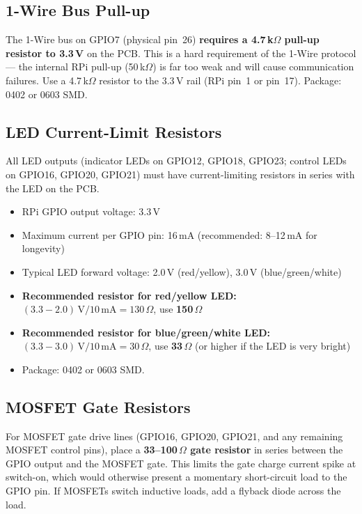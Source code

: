 \documentclass[11pt,a4paper]{article}
\begin{document}
\subsection{1-Wire Bus Pull-up}

\begin{warnbox}
The 1-Wire bus on GPIO7 (physical pin~26) \textbf{requires a 4.7\,k$\Omega$ pull-up
resistor to 3.3\,V} on the PCB.
This is a hard requirement of the 1-Wire protocol --- the internal RPi pull-up
(50\,k$\Omega$) is far too weak and will cause communication failures.
Use a 4.7\,k$\Omega$ resistor to the 3.3\,V rail (RPi pin~1 or pin~17).
Package: 0402 or 0603 SMD.
\end{warnbox}

\subsection{LED Current-Limit Resistors}

All LED outputs (indicator LEDs on GPIO12, GPIO18, GPIO23;
control LEDs on GPIO16, GPIO20, GPIO21) must have current-limiting
resistors in series with the LED on the PCB.

\begin{itemize}[noitemsep]
  \item RPi GPIO output voltage: 3.3\,V
  \item Maximum current per GPIO pin: 16\,mA (recommended: 8--12\,mA for longevity)
  \item Typical LED forward voltage: 2.0\,V (red/yellow), 3.0\,V (blue/green/white)
  \item \textbf{Recommended resistor for red/yellow LED:}
        $(3.3 - 2.0)\,\text{V} / 10\,\text{mA} = 130\,\Omega$, use \textbf{150\,$\Omega$}
  \item \textbf{Recommended resistor for blue/green/white LED:}
        $(3.3 - 3.0)\,\text{V} / 10\,\text{mA} = 30\,\Omega$, use \textbf{33\,$\Omega$}
        (or higher if the LED is very bright)
  \item Package: 0402 or 0603 SMD.
\end{itemize}

\subsection{MOSFET Gate Resistors}

For MOSFET gate drive lines (GPIO16, GPIO20, GPIO21, and any remaining
MOSFET control pins), place a \textbf{33--100\,$\Omega$ gate resistor}
in series between the GPIO output and the MOSFET gate.
This limits the gate charge current spike at switch-on,
which would otherwise present a momentary short-circuit load to the GPIO pin.
If MOSFETs switch inductive loads, add a flyback diode across the load.
\end{document}
